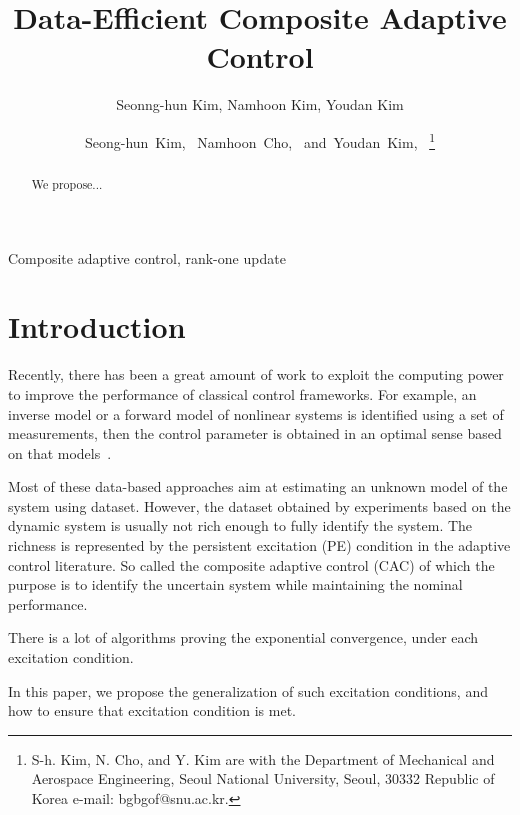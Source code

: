 \documentclass[]{IEEEtran}
\theoremstyle{definition}
\theoremstyle{remark}
\begin{document}
\title{Data-Efficient Composite Adaptive Control}
\author{Seonng-hun Kim, Namhoon Kim, Youdan Kim}
\author{Seong-hun~Kim,~
        Namhoon~Cho,~
        and~Youdan~Kim,~ %
\thanks{S-h. Kim, N. Cho, and Y. Kim are with the Department
of Mechanical and Aerospace Engineering, Seoul National University, Seoul,
30332 Republic of Korea e-mail: bgbgof@snu.ac.kr.}}
\maketitle



\begin{abstract}
	We propose...
\end{abstract}


\begin{IEEEkeywords}
	Composite adaptive control, rank-one update
\end{IEEEkeywords}


\section{Introduction}

Recently, there has been a great amount of work to exploit the computing power
to improve the performance of classical control frameworks. For example, an
inverse model or a forward model of nonlinear systems is identified using a set
of measurements, then the control parameter is obtained in an optimal sense
based on that models~\cite{novara_data-driven_2018}.

Most of these data-based approaches aim at estimating an unknown model of the
system using dataset. However, the dataset obtained by experiments based on the
dynamic system is usually not rich enough to fully identify the system. The
richness is represented by the persistent excitation (PE) condition in the
adaptive control literature. So called the composite adaptive control (CAC)
of which the purpose is to identify the uncertain system while maintaining the
nominal performance.

There is a lot of algorithms proving the exponential convergence, under each
excitation condition.

In this paper, we propose the generalization of such excitation conditions, and
how to ensure that excitation condition is met.
\end{document}
